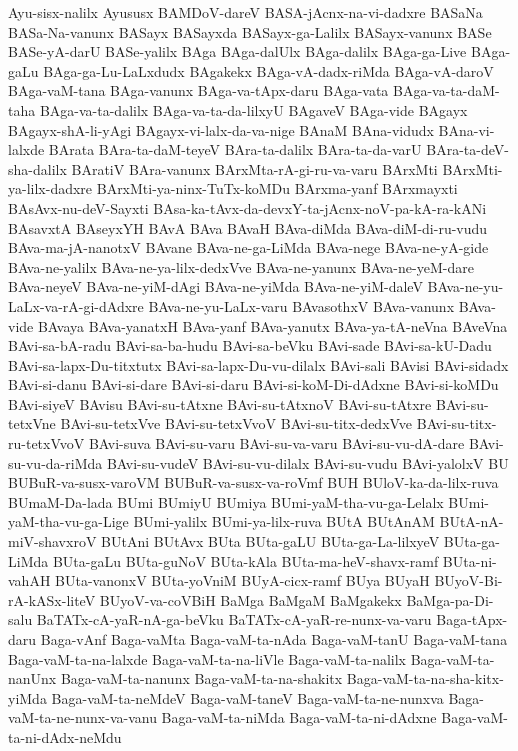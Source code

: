 {Ayu-sisx-nalilx
Ayususx
BAMDoV-dareV
BASA-jAcnx-na-vi-dadxre
BASaNa
BASa-Na-vanunx
BASayx
BASayxda
BASayx-ga-Lalilx
BASayx-vanunx
BASe
BASe-yA-darU
BASe-yalilx
BAga
BAga-dalUlx
BAga-dalilx
BAga-ga-Live
BAga-gaLu
BAga-ga-Lu-LaLxdudx
BAgakekx
BAga-vA-dadx-riMda
BAga-vA-daroV
BAga-vaM-tana
BAga-vanunx
BAga-va-tApx-daru
BAga-vata
BAga-va-ta-daM-taha
BAga-va-ta-dalilx
BAga-va-ta-da-lilxyU
BAgaveV
BAga-vide
BAgayx
BAgayx-shA-li-yAgi
BAgayx-vi-lalx-da-va-nige
BAnaM
BAna-vidudx
BAna-vi-lalxde
BArata
BAra-ta-daM-teyeV
BAra-ta-dalilx
BAra-ta-da-varU
BAra-ta-deV-sha-dalilx
BAratiV
BAra-vanunx
BArxMta-rA-gi-ru-va-varu
BArxMti
BArxMti-ya-lilx-dadxre
BArxMti-ya-ninx-TuTx-koMDu
BArxma-yanf
BArxmayxti
BAsAvx-nu-deV-Sayxti
BAsa-ka-tAvx-da-devxY-ta-jAcnx-noV-pa-kA-ra-kANi
BAsavxtA
BAseyxYH
BAvA
BAva
BAvaH
BAva-diMda
BAva-diM-di-ru-vudu
BAva-ma-jA-nanotxV
BAvane
BAva-ne-ga-LiMda
BAva-nege
BAva-ne-yA-gide
BAva-ne-yalilx
BAva-ne-ya-lilx-dedxVve
BAva-ne-yanunx
BAva-ne-yeM-dare
BAva-neyeV
BAva-ne-yiM-dAgi
BAva-ne-yiMda
BAva-ne-yiM-daleV
BAva-ne-yu-LaLx-va-rA-gi-dAdxre
BAva-ne-yu-LaLx-varu
BAvasothxV
BAva-vanunx
BAva-vide
BAvaya
BAva-yanatxH
BAva-yanf
BAva-yanutx
BAva-ya-tA-neVna
BAveVna
BAvi-sa-bA-radu
BAvi-sa-ba-hudu
BAvi-sa-beVku
BAvi-sade
BAvi-sa-kU-Dadu
BAvi-sa-lapx-Du-titxtutx
BAvi-sa-lapx-Du-vu-dilalx
BAvi-sali
BAvisi
BAvi-sidadx
BAvi-si-danu
BAvi-si-dare
BAvi-si-daru
BAvi-si-koM-Di-dAdxne
BAvi-si-koMDu
BAvi-siyeV
BAvisu
BAvi-su-tAtxne
BAvi-su-tAtxnoV
BAvi-su-tAtxre
BAvi-su-tetxVne
BAvi-su-tetxVve
BAvi-su-tetxVvoV
BAvi-su-titx-dedxVve
BAvi-su-titx-ru-tetxVvoV
BAvi-suva
BAvi-su-varu
BAvi-su-va-varu
BAvi-su-vu-dA-dare
BAvi-su-vu-da-riMda
BAvi-su-vudeV
BAvi-su-vu-dilalx
BAvi-su-vudu
BAvi-yalolxV
BU
BUBuR-va-susx-varoVM
BUBuR-va-susx-va-roVmf
BUH
BUloV-ka-da-lilx-ruva
BUmaM-Da-lada
BUmi
BUmiyU
BUmiya
BUmi-yaM-tha-vu-ga-Lelalx
BUmi-yaM-tha-vu-ga-Lige
BUmi-yalilx
BUmi-ya-lilx-ruva
BUtA
BUtAnAM
BUtA-nA-miV-shavxroV
BUtAni
BUtAvx
BUta
BUta-gaLU
BUta-ga-La-lilxyeV
BUta-ga-LiMda
BUta-gaLu
BUta-guNoV
BUta-kAla
BUta-ma-heV-shavx-ramf
BUta-ni-vahAH
BUta-vanonxV
BUta-yoVniM
BUyA-cicx-ramf
BUya
BUyaH
BUyoV-Bi-rA-kASx-liteV
BUyoV-va-coVBiH
BaMga
BaMgaM
BaMgakekx
BaMga-pa-Di-salu
BaTATx-cA-yaR-nA-ga-beVku
BaTATx-cA-yaR-re-nunx-va-varu
Baga-tApx-daru
Baga-vAnf
Baga-vaMta
Baga-vaM-ta-nAda
Baga-vaM-tanU
Baga-vaM-tana
Baga-vaM-ta-na-lalxde
Baga-vaM-ta-na-liVle
Baga-vaM-ta-nalilx
Baga-vaM-ta-nanUnx
Baga-vaM-ta-nanunx
Baga-vaM-ta-na-shakitx
Baga-vaM-ta-na-sha-kitx-yiMda
Baga-vaM-ta-neMdeV
Baga-vaM-taneV
Baga-vaM-ta-ne-nunxva
Baga-vaM-ta-ne-nunx-va-vanu
Baga-vaM-ta-niMda
Baga-vaM-ta-ni-dAdxne
Baga-vaM-ta-ni-dAdx-neMdu
}
